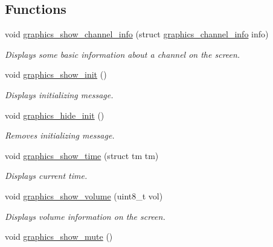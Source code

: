 \subsection*{Functions}
\begin{DoxyCompactItemize}
\item 
void \hyperlink{group__graphics_ga741d634a2444a13cc83411c4bb98d948}{graphics\+\_\+show\+\_\+channel\+\_\+info} (struct \hyperlink{structgraphics__channel__info}{graphics\+\_\+channel\+\_\+info} info)\hypertarget{group__graphics_ga741d634a2444a13cc83411c4bb98d948}{}\label{group__graphics_ga741d634a2444a13cc83411c4bb98d948}

\begin{DoxyCompactList}\small\item\em Displays some basic information about a channel on the screen. \end{DoxyCompactList}\item 
void \hyperlink{group__graphics_ga07d069f854ed989682f48d8eb2b96392}{graphics\+\_\+show\+\_\+init} ()\hypertarget{group__graphics_ga07d069f854ed989682f48d8eb2b96392}{}\label{group__graphics_ga07d069f854ed989682f48d8eb2b96392}

\begin{DoxyCompactList}\small\item\em Displays initializing message. \end{DoxyCompactList}\item 
void \hyperlink{group__graphics_gaa14c15905aaa8584ac0d41629e63179e}{graphics\+\_\+hide\+\_\+init} ()\hypertarget{group__graphics_gaa14c15905aaa8584ac0d41629e63179e}{}\label{group__graphics_gaa14c15905aaa8584ac0d41629e63179e}

\begin{DoxyCompactList}\small\item\em Removes initializing message. \end{DoxyCompactList}\item 
void \hyperlink{group__graphics_ga9cfad8e0d3cdb8597e3f3a2bdfd3bfda}{graphics\+\_\+show\+\_\+time} (struct tm tm)\hypertarget{group__graphics_ga9cfad8e0d3cdb8597e3f3a2bdfd3bfda}{}\label{group__graphics_ga9cfad8e0d3cdb8597e3f3a2bdfd3bfda}

\begin{DoxyCompactList}\small\item\em Displays current time. \end{DoxyCompactList}\item 
void \hyperlink{group__graphics_gaf1c74824677854f7abe3e6590343580f}{graphics\+\_\+show\+\_\+volume} (uint8\+\_\+t vol)
\begin{DoxyCompactList}\small\item\em Displays volume information on the screen. \end{DoxyCompactList}\item 
void \hyperlink{group__graphics_ga88347b80264b415007253f935d32023c}{graphics\+\_\+show\+\_\+mute} ()\hypertarget{group__graphics_ga88347b80264b415007253f935d32023c}{}\label{group__graphics_ga88347b80264b415007253f935d32023c}


\end{DoxyCompactItemize}
